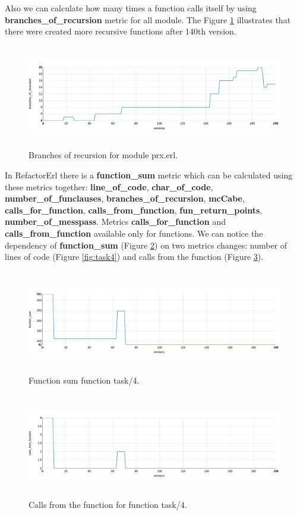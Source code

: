 Also we can calculate how many times a function calls itself by using \textbf{branches\_of\_recursion} metric for all module. The Figure \ref{fig:br} illustrates that there were created more recursive functions after 140th version.

\begin{figure}[ht]
	\centering
	\includegraphics[height=45mm]{figures/br.png}
	\caption{Branches of recursion for module prx.erl.} 
	\label{fig:br}
\end{figure}

In RefactorErl there is a \textbf{function\_sum} metric which can be calculated using these metrics together: \textbf{line\_of\_code}, \textbf{char\_of\_code}, \textbf{number\_of\_funclauses}, \textbf{branches\_of\_recursion},
\textbf{mcCabe}, \textbf{calls\_for\_function}, \textbf{calls\_from\_function}, \textbf{fun\_return\_points}, \textbf{number\_of\_messpass}. Metrics \textbf{calls\_for\_function} and \textbf{calls\_from\_function} available only for functions. We can notice the dependency of \textbf{function\_sum} (Figure \ref{fig:function_sum_task4}) on two metrics changes: number of lines of code (Figure \ref{fig:task4}) and calls from the function (Figure \ref{fig:calls_from_function_task4}).

\begin{figure}[ht]
	\centering
	\includegraphics[height=45mm]{figures/function_sum_task4.png}
	\caption{Function sum function task/4.} 
	\label{fig:function_sum_task4}
\end{figure}

\begin{figure}[ht]
	\centering
	\includegraphics[height=45mm]{figures/calls_from_function_task4.png}
	\caption{Calls from the function for function task/4.} 
	\label{fig:calls_from_function_task4}
\end{figure}

